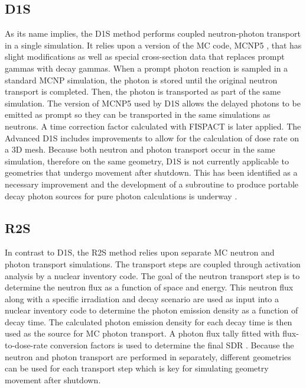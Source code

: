 \subsection{D1S}
As its name implies, the D1S method performs coupled neutron-photon transport
in a single simulation.  It relies upon a version of the MC code,
MCNP5 \cite{mcnp_manual}, that has slight modifications as well as special 
cross-section data that replaces prompt gammas with decay gammas.
When a prompt photon reaction is sampled in a standard MCNP simulation,
the photon is stored until the original neutron transport is
completed. Then, the photon is transported as part of the same simulation.
The version of MCNP5 used by D1S 
allows the delayed 
photons to be emitted as prompt so they can be transported in the same simulations
as neutrons. A time correction factor calculated with FISPACT \cite{fispact} is later applied.
The Advanced D1S \cite{adv-d1s} includes improvements to allow for the
calculation of dose rate on a 3D mesh.
Because both neutron and photon transport occur in the same simulation,
therefore on the same geometry, D1S
is not currently applicable to geometries that undergo movement after shutdown.
This has been identified as a necessary improvement and the development of a
subroutine to produce portable decay photon sources for pure photon
calculations is underway \cite{adv-d1s}. 

\subsection{R2S}\label{sec:r2s}
In contrast to D1S, the R2S method relies upon separate MC neutron and photon
transport simulations.  The transport steps are coupled through activation analysis 
by a nuclear inventory code.
The goal of the neutron transport step is to determine the neutron flux
as a function of space and energy.  This neutron flux along with a specific irradiation
and decay scenario are used as input into a nuclear inventory
code to determine the photon emission density as a function of decay time.
The calculated photon emission density for each decay time
is then used as the source for MC photon transport.  A photon flux tally
fitted with flux-to-dose-rate conversion factors is used to
determine the final SDR \cite{r2s}.
Because the neutron and photon transport are performed in separately,
different geometries can be used for each transport step which is key for
simulating geometry movement after shutdown.
